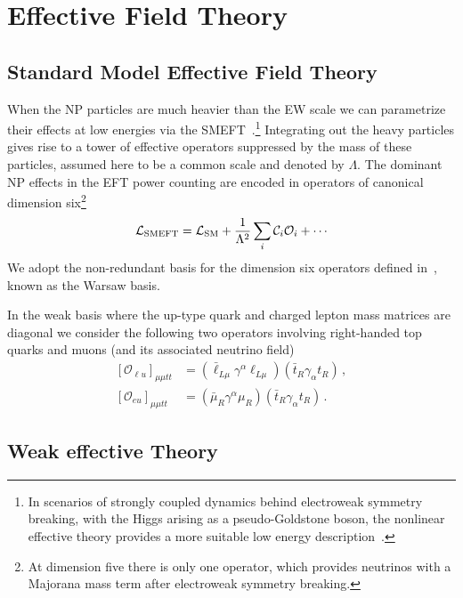 \documentclass[aps,twocolumn,showpacs,preprintnumbers,amsmath,amssymb,floatfix,nofootinbib]{revtex4-1}
\newcommand{\C}{{\cal C}}
\begin{document}
\section{Effective Field Theory} \label{seceft}


\subsection{Standard Model Effective Field Theory}   \label{sec:smeft}  

When the NP particles are much heavier than the EW scale we can parametrize their effects at low energies via the SMEFT~\cite{Buchmuller:1985jz}.\footnote{In scenarios of strongly coupled dynamics behind electroweak symmetry breaking, with the Higgs arising as a pseudo-Goldstone boson, the nonlinear effective theory provides a more suitable low energy description~\cite{Buchalla:2013eza,Pich:2018ltt}.     }  Integrating out the heavy particles gives rise to a tower of effective operators suppressed by the mass of these particles, assumed here to be a common scale and denoted by $\Lambda$.  The dominant NP effects in the EFT power counting are encoded in operators of canonical dimension six\footnote{At dimension five there is only one operator, which provides neutrinos with a Majorana mass term after electroweak symmetry breaking.}
%
\begin{align}
\mathcal{L}_{\rm{SMEFT}}  = \mathcal{L}_{\rm{SM}}  +  \frac{1}{\Lambda^2}  \sum_i \C_i \mathcal{O}_i + \cdots
\end{align}
%
We adopt the non-redundant basis for the dimension six operators defined in~\cite{Grzadkowski:2010es}, known as the Warsaw basis.     

In the weak basis where the up-type quark and charged lepton mass matrices are diagonal we consider the following two operators involving right-handed top quarks and muons (and its associated neutrino field)
%
\begin{align} \label{twoop}
[\mathcal{O}_{\ell u}]_{\mu \mu tt} &= (\bar \ell_{ L \mu} \gamma^{\alpha}  \ell_{ L \mu}) (\bar t_R \gamma_{\alpha}  t_R  )  \,, \nonumber \\
[\mathcal{O}_{eu}]_{\mu \mu tt} &= (\bar \mu_{R} \gamma^{\alpha}  \mu_{R}) (\bar t_R  \gamma_{\alpha}  t_R  )   \,.
\end{align}
%

 
\subsection{Weak effective Theory}
\end{document}
